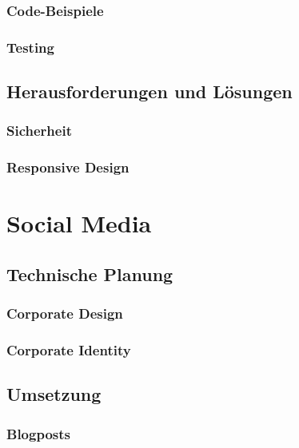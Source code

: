     \subsubsection{Code-Beispiele}

    \subsubsection{Testing}

  \subsection{Herausforderungen und Lösungen}

    \subsubsection{Sicherheit}

    \subsubsection{Responsive Design}

\section{Social Media}

  \subsection{Technische Planung}

    \subsubsection{Corporate Design}

    \subsubsection{Corporate Identity}

  \subsection{Umsetzung}

    \subsubsection{Blogposts}

